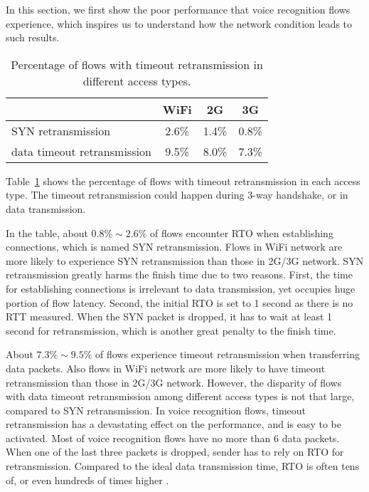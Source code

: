 In this section, we first show the poor performance that voice recognition flows experience, which inspires us to understand how the network condition leads to such results.

\begin{table}[th]
\centering
\renewcommand{\arraystretch}{1.2}
\caption{Percentage of flows with timeout retransmission in different access types.}
\label{tab:voice_stats}
\begin{tabular}{l|c|c|c}
	\toprule
	 & WiFi & 2G & 3G \\
	\midrule
	SYN retransmission & 2.6\% & 1.4\% & 0.8\% \\
	\hline
	data timeout retransmission & 9.5\% & 8.0\% & 7.3\% \\
	\bottomrule
\end{tabular}
\end{table}

Table~\ref{tab:voice_stats} shows the percentage of flows with timeout retransmission in each access type. The timeout retransmission could happen during 3-way handshake, or in data transmission.

In the table, about $0.8\% \sim 2.6\%$ of flows encounter RTO when establishing connections, which is named SYN retransmission. Flows in WiFi network are more likely to experience SYN retransmission than those in 2G/3G network. SYN retransmission greatly harms the finish time due to two reasons. First, the time for establishing connections is irrelevant to data transmission, yet occupies huge portion of flow latency. Second, the initial RTO is set to 1 second \cite{rfc62982011computing} as there is no RTT measured. When the SYN packet is dropped, it has to wait at least 1 second for retransmission, which is another great penalty to the finish time.

About $7.3\% \sim 9.5\%$ of flows experience timeout retransmission when transferring data packets. Also flows in WiFi network are more likely to have timeout retransmission than those in 2G/3G network. However, the disparity of flows with data timeout retransmission among different access types is not that large, compared to SYN retransmission. In voice recognition flows, timeout retransmission has a devastating effect on the performance, and is easy to be activated. Most of voice recognition flows have no more than 6 data packets. When one of the last three packets is dropped, sender has to rely on RTO for retransmission. Compared to the ideal data transmission time, RTO is often tens of, or even hundreds of times higher \cite{flach2013reducing}.

